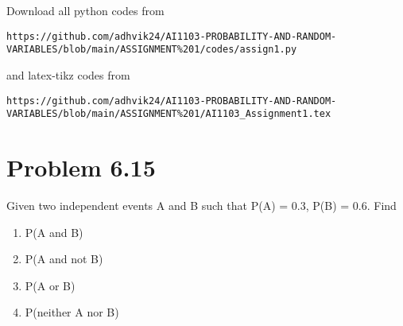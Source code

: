 \documentclass[journal,12pt,twocolumn]{IEEEtran}
\begin{document}
\maketitle
\newpage
\bigskip
\renewcommand{\thefigure}{\theenumi}
\renewcommand{\thetable}{\theenumi}
Download all python codes from 
\begin{lstlisting}
https://github.com/adhvik24/AI1103-PROBABILITY-AND-RANDOM-VARIABLES/blob/main/ASSIGNMENT%201/codes/assign1.py
\end{lstlisting}
%
and latex-tikz codes from 
%
\begin{lstlisting}
https://github.com/adhvik24/AI1103-PROBABILITY-AND-RANDOM-VARIABLES/blob/main/ASSIGNMENT%201/AI1103_Assignment1.tex
\end{lstlisting}
\section{Problem 6.15}
Given two independent events A and B such
that P(A) = 0.3, P(B) = 0.6. Find
\begin{enumerate}[label={\roman*)}]
    \item P(A and B)
    \item P(A and not B)
    \item P(A or B)
    \item P(neither A nor B)
\end{enumerate}
\end{document}
